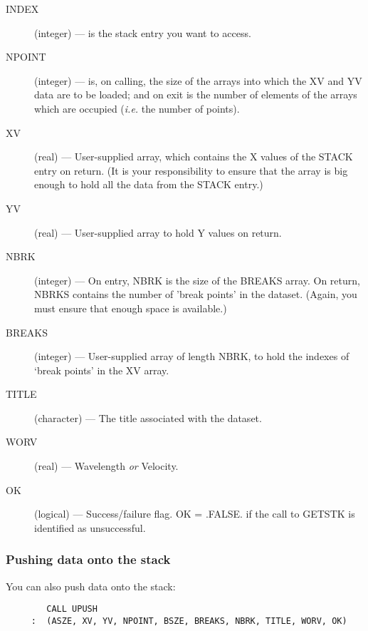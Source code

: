 \begin{description}
\begin{description}

\item [INDEX] (integer) --- is the stack entry you want to access.

\item [NPOINT] (integer) --- is, on calling, the size of the arrays
into which the XV and YV data are to be loaded; and on exit is the
number of elements of the arrays which are occupied ({\em i.e.} the
number of points).

\item [XV] (real) --- User-supplied array, which contains the X values
of the STACK entry on return. (It is your responsibility to ensure
that the array is big enough to hold all the data from the STACK
entry.)

\item [YV] (real) --- User-supplied array to hold Y values on return.

\item [NBRK] (integer) --- On entry, NBRK is the size of the BREAKS
array. On return, NBRKS contains the number of 'break points' in the
dataset. (Again, you must ensure that enough space is available.)

\item [BREAKS] (integer) --- User-supplied array of length NBRK, to
hold the indexes of `break points' in the XV array.

\item [TITLE] (character) --- The title associated with the dataset.

\item [WORV] (real) --- Wavelength {\em or} Velocity.

\item [OK] (logical) --- Success/failure flag. OK = .FALSE. if the
call to GETSTK is identified as unsuccessful.

\end{description}
\end{description}

\subsubsection {Pushing data onto the stack}

You can also push data onto the stack:

\begin{verbatim}
        CALL UPUSH
     :  (ASZE, XV, YV, NPOINT, BSZE, BREAKS, NBRK, TITLE, WORV, OK)
\end{verbatim}

